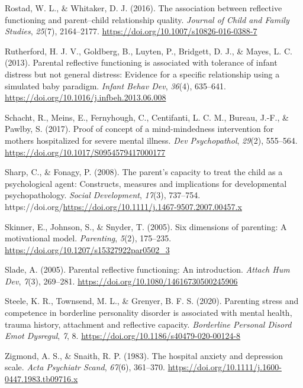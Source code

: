 \documentclass[
]{article}
\newlength{\cslhangindent}
\newlength{\cslentryspacingunit} %
\newenvironment{CSLReferences}[2] %
 {%
  \setlength{\parindent}{0pt}
  \ifodd #1
  \let\oldpar\par
  \def\par{\hangindent=\cslhangindent\oldpar}
  \fi
  \setlength{\parskip}{#2\cslentryspacingunit}
 }%
 {}
\begin{document}
\begin{CSLReferences}{1}{0}
\leavevmode{}%
Rostad, W. L., \& Whitaker, D. J. (2016). The association between reflective functioning and parent--child relationship quality. \emph{Journal of Child and Family Studies}, \emph{25}(7), 2164--2177. \url{https://doi.org/10.1007/s10826-016-0388-7}

\leavevmode{}%
Rutherford, H. J. V., Goldberg, B., Luyten, P., Bridgett, D. J., \& Mayes, L. C. (2013). Parental reflective functioning is associated with tolerance of infant distress but not general distress: Evidence for a specific relationship using a simulated baby paradigm. \emph{Infant Behav Dev}, \emph{36}(4), 635--641. \url{https://doi.org/10.1016/j.infbeh.2013.06.008}

\leavevmode{}%
Schacht, R., Meins, E., Fernyhough, C., Centifanti, L. C. M., Bureau, J.-F., \& Pawlby, S. (2017). Proof of concept of a mind-mindedness intervention for mothers hospitalized for severe mental illness. \emph{Dev Psychopathol}, \emph{29}(2), 555--564. \url{https://doi.org/10.1017/S0954579417000177}

\leavevmode{}%
Sharp, C., \& Fonagy, P. (2008). The parent's capacity to treat the child as a psychological agent: Constructs, measures and implications for developmental psychopathology. \emph{Social Development}, \emph{17}(3), 737--754. https://doi.org/\url{https://doi.org/10.1111/j.1467-9507.2007.00457.x}

\leavevmode{}%
Skinner, E., Johnson, S., \& Snyder, T. (2005). Six dimensions of parenting: A motivational model. \emph{Parenting}, \emph{5}(2), 175--235. \url{https://doi.org/10.1207/s15327922par0502_3}

\leavevmode{}%
Slade, A. (2005). Parental reflective functioning: An introduction. \emph{Attach Hum Dev}, \emph{7}(3), 269--281. \url{https://doi.org/10.1080/14616730500245906}

\leavevmode{}%
Steele, K. R., Townsend, M. L., \& Grenyer, B. F. S. (2020). Parenting stress and competence in borderline personality disorder is associated with mental health, trauma history, attachment and reflective capacity. \emph{Borderline Personal Disord Emot Dysregul}, \emph{7}, 8. \url{https://doi.org/10.1186/s40479-020-00124-8}

\leavevmode{}%
Zigmond, A. S., \& Snaith, R. P. (1983). The hospital anxiety and depression scale. \emph{Acta Psychiatr Scand}, \emph{67}(6), 361--370. \url{https://doi.org/10.1111/j.1600-0447.1983.tb09716.x}

\end{CSLReferences}
\end{document}

